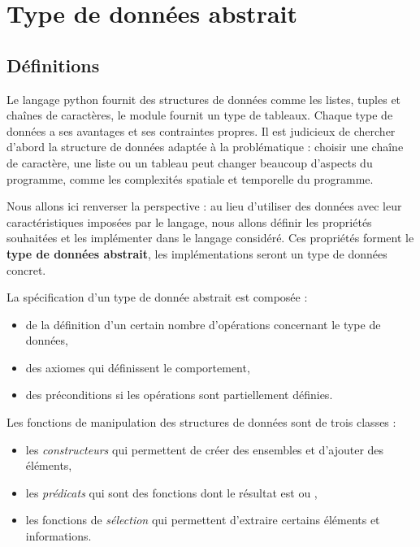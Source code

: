 \section{Type de données abstrait}
\subsection{Définitions}
Le langage python fournit des structures de données comme les listes, tuples et chaînes de caractères, le module  fournit un type de tableaux. Chaque type de données a ses  avantages et ses contraintes propres. Il est judicieux de chercher d'abord la structure de données adaptée à la problématique : choisir  une chaîne de caractère, une liste ou un tableau  peut changer beaucoup d'aspects du programme, comme les complexités spatiale et temporelle du programme.

Nous allons ici renverser la perspective : au lieu d'utiliser des données avec leur caractéristiques imposées par le langage, nous allons définir les propriétés souhaitées et les implémenter dans le langage considéré. Ces propriétés forment le {\bf type de données abstrait}, les implémentations seront un type de données concret.


La spécification d'un type de donnée abstrait est composée  :
\begin{itemize}
\item de la définition d'un certain nombre d'opérations concernant le type de données,
\item des axiomes qui définissent le comportement,
\item des préconditions si les opérations sont partiellement définies.
\end{itemize}

Les fonctions de manipulation des structures de données sont de trois classes : 

\begin{itemize}
\item les {\it constructeurs} qui permettent de créer des ensembles et d'ajouter des éléments,
\item les {\it prédicats} qui sont des fonctions dont le résultat est  ou ,
\item les fonctions de  {\it sélection} qui permettent d'extraire certains éléments et informations. 
\end{itemize}

